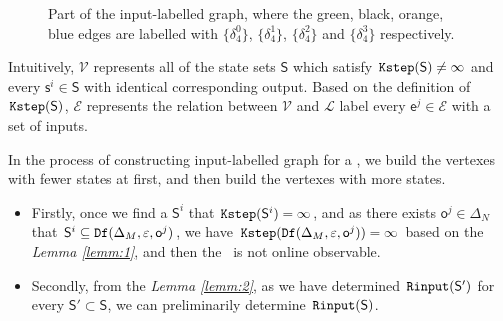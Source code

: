 \begin{figure}[thpb]
      \centering
      \caption{Part of the input-labelled graph, where the green, black, orange, blue edges are labelled with $\{\delta_4^0\}$, $\{\delta_4^1\}$, $\{\delta_4^2\}$ and $\{\delta_4^3\}$ respectively.}
      \label{fig:4}
\end{figure}

Intuitively, $\mathcal{V}$ represents all of the state sets $\mathsf{S}$ which satisfy ${\tt Kstep}(\mathsf{S})\ne \infty$ and every $\mathsf{s}^i\in\mathsf{S}$ with identical corresponding output. Based on the definition of ${\tt Kstep}(\mathsf{S})$, $\mathcal{E}$ represents the relation between $\mathcal{V}$ and $\mathcal{L}$ label every $\mathsf{e}^j \in\mathcal{E}$ with a set of inputs. %


In the process of constructing input-labelled graph for a \BCN, we build the vertexes with fewer states at first, and then build the vertexes with more states.
\begin{itemize}
\item  Firstly, once we find a $\mathsf{S}^i$ that ${\tt Kstep}(\mathsf{S}^i)= \infty$, and as there exists $\mathsf{o}^{j}\in \Delta_N$ that $\mathsf{S}^{i}\subseteq {\tt Df}(\Delta_M,\varepsilon, \mathsf{o}^{j})$, we have ${\tt Kstep}({\tt Df}(\Delta_M,\varepsilon, \mathsf{o}^{j}))= \infty$ based on the {\em Lemma \ref{lemm:1}}, and then the \BCN\ is not online observable.
\item  Secondly, from the {\em Lemma \ref{lemm:2}}, as we have determined ${\tt Rinput}(\mathsf{S}')$ for every $\mathsf{S}'\subset\mathsf{S}$, we can preliminarily determine ${\tt Rinput}(\mathsf{S})$.
 \end{itemize}
